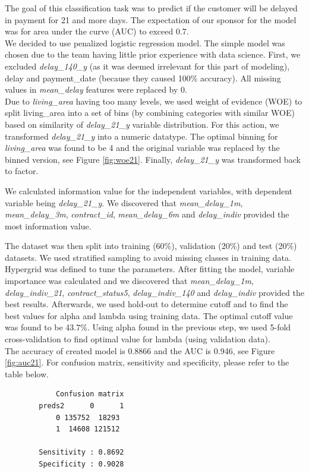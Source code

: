 \documentclass[
]{article}
\begin{document}
The goal of this classification task was to predict if the customer will be delayed in payment for 21 and more days. The expectation of our sponsor for the model was for area under the curve (AUC) to exceed 0.7.\\
We decided to use penalized logistic regression model. The simple model was chosen due to the team having little prior experience with data science. First, we excluded \emph{delay\_140\_y} (as it was deemed irrelevant for this part of modeling), delay and payment\_date (because they caused 100\% accuracy). All missing values in \emph{mean\_delay} features were replaced by 0.\\
Due to \emph{living\_area} having too many levels, we used weight of evidence (WOE) to split living\_area into a set of bins (by combining categories with similar WOE) based on similarity of \emph{delay\_21\_y} variable distribution. For this action, we transformed \emph{delay\_21\_y} into a numeric datatype. The optimal binning for \emph{living\_area} was found to be 4 and the original variable was replaced by the binned version, see Figure \ref{fig:woe21}. Finally, \emph{delay\_21\_y} was transformed back to factor.

We calculated information value for the independent variables, with dependent variable being \emph{delay\_21\_y}. We discovered that \emph{mean\_delay\_1m}, \emph{mean\_delay\_3m}, \emph{contract\_id}, \emph{mean\_delay\_6m} and \emph{delay\_indiv} provided the most information value.

The dataset was then split into training (60\%), validation (20\%) and test (20\%) datasets. We used stratified sampling to avoid missing classes in training data.
Hypergrid was defined to tune the parameters. After fitting the model, variable importance was calculated and we discovered that \emph{mean\_delay\_1m}, \emph{delay\_indiv\_21}, \emph{contract\_status5}, \emph{delay\_indiv\_140} and \emph{delay\_indiv} provided the best results.
Afterwards, we used hold-out to determine cutoff and to find the best values for alpha and lambda using training data. The optimal cutoff value was found to be 43.7\%. Using alpha found in the previous step, we used 5-fold cross-validation to find optimal value for lambda (using validation data).\\
The accuracy of created model is 0.8866 and the AUC is 0.946, see Figure \ref{fig:auc21}. For confusion matrix, sensitivity and specificity, please refer to the table below.

\begin{verbatim}
            Confusion matrix
        preds2      0      1
            0 135752  18293
            1  14608 121512
            
        Sensitivity : 0.8692          
        Specificity : 0.9028 
\end{verbatim}
\end{document}
